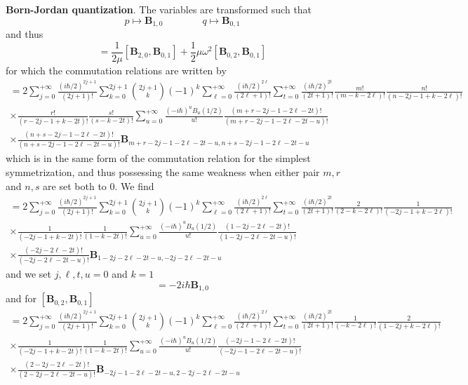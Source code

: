 \documentclass[a4paper]{article}
\theoremstyle{definition}
\begin{document}
\textbf{Born-Jordan quantization}. The variables are transformed such that
\begin{equation}
	p\mapsto\textbf{B}_{1,0}\qquad\qquad q\mapsto\textbf{B}_{0,1}
\end{equation}
and thus
\begin{equation}
	[\textbf{H}_{BJ},\textbf{B}_{0,1}]=\frac{1}{2\mu}[\textbf{B}_{2,0},\textbf{B}_{0,1}]+\frac{1}{2}\mu\omega^2[\textbf{B}_{0,2},\textbf{B}_{0,1}]
\end{equation}
for which the commutation relations are written by \cite{Domingo2015}
\begin{multline}
	[\textbf{B}_{m,n},\textbf{B}_{r,s}]=2\sum_{j=0}^{+\infty}\frac{(i\hbar/2)^{2j+1}}{(2j+1)!}\sum_{k=0}^{2j+1}\binom{2j+1}{k}(-1)^k\sum_{\ell=0}^{+\infty}\frac{(i\hbar/2)^{2\ell}}{(2\ell+1)!}\sum_{t=0}^{+\infty}\frac{(i\hbar/2)^{2t}}{(2t+1)!}\frac{m!}{(m-k-2\ell)!}\frac{n!}{(n-2j-1+k-2\ell)!}\\\times\frac{r!}{(r-2j-1+k-2t)!}\frac{s!}{(s-k-2t)!}\sum_{u=0}^{+\infty}\frac{(-i\hbar)^uB_u(1/2)}{u!}\frac{(m+r-2j-1-2\ell-2t)!}{(m+r-2j-1-2\ell-2t-u)!}\\\times\frac{(n+s-2j-1-2\ell-2t)!}{(n+s-2j-1-2\ell-2t-u)!}\textbf{B}_{m+r-2j-1-2\ell-2t-u,n+s-2j-1-2\ell-2t-u}
\end{multline}
which is in the same form of the commutation relation for the simplest symmetrization, and thus possessing the same weakness when either pair $m,r$ and $n,s$ are set both to 0. We find
\begin{multline}
	[\textbf{B}_{2,0},\textbf{B}_{0,1}]=2\sum_{j=0}^{+\infty}\frac{(i\hbar/2)^{2j+1}}{(2j+1)!}\sum_{k=0}^{2j+1}\binom{2j+1}{k}(-1)^k\sum_{\ell=0}^{+\infty}\frac{(i\hbar/2)^{2\ell}}{(2\ell+1)!}\sum_{t=0}^{+\infty}\frac{(i\hbar/2)^{2t}}{(2t+1)!}\frac{2}{(2-k-2\ell)!}\frac{1}{(-2j-1+k-2\ell)!}\\\times\frac{1}{(-2j-1+k-2t)!}\frac{1}{(1-k-2t)!}\sum_{u=0}^{+\infty}\frac{(-i\hbar)^uB_u(1/2)}{u!}\frac{(1-2j-2\ell-2t)!}{(1-2j-2\ell-2t-u)!}\\\times\frac{(-2j-2\ell-2t)!}{(-2j-2\ell-2t-u)!}\textbf{B}_{1-2j-2\ell-2t-u,-2j-2\ell-2t-u}
\end{multline}
and we set $j,\ell,t,u=0$ and $k=1$
\begin{equation}
	[\textbf{B}_{2,0},\textbf{B}_{0,1}]=-2i\hbar\textbf{B}_{1,0}
\end{equation}
and for $[\textbf{B}_{0,2},\textbf{B}_{0,1}]$
\begin{multline}
	[\textbf{B}_{0,2},\textbf{B}_{0,1}]=2\sum_{j=0}^{+\infty}\frac{(i\hbar/2)^{2j+1}}{(2j+1)!}\sum_{k=0}^{2j+1}\binom{2j+1}{k}(-1)^k\sum_{\ell=0}^{+\infty}\frac{(i\hbar/2)^{2\ell}}{(2\ell+1)!}\sum_{t=0}^{+\infty}\frac{(i\hbar/2)^{2t}}{(2t+1)!}\frac{1}{(-k-2\ell)!}\frac{2}{(1-2j+k-2\ell)!}\\\times\frac{1}{(-2j-1+k-2t)!}\frac{1}{(1-k-2t)!}\sum_{u=0}^{+\infty}\frac{(-i\hbar)^uB_u(1/2)}{u!}\frac{(-2j-1-2\ell-2t)!}{(-2j-1-2\ell-2t-u)!}\\\times\frac{(2-2j-2\ell-2t)!}{(2-2j-2\ell-2t-u)!}\textbf{B}_{-2j-1-2\ell-2t-u,2-2j-2\ell-2t-u}
\end{multline}
\end{document}
